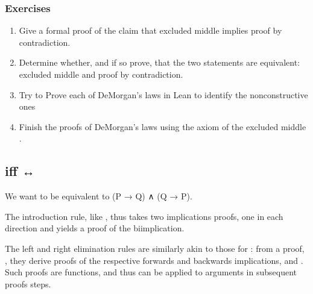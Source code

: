 \documentclass[letterpaper,10pt,english]{sphinxmanual}
\begin{document}
\subsubsection{Exercises}
\label{\detokenize{A_02_Constructive_Logic:exercises}}\begin{enumerate}
%
\item {} 
\sphinxAtStartPar
Give a formal proof of the claim that excluded middle implies proof by contradiction.

\item {} 
\sphinxAtStartPar
Determine whether, and if so prove, that the two statements are equivalent: excluded middle and proof by contradiction.

\item {} 
\sphinxAtStartPar
Try to Prove each of DeMorgan’s laws in Lean to identify the non\sphinxhyphen{}constructive ones

\item {} 
\sphinxAtStartPar
Finish the proofs of DeMorgan’s laws using the axiom of the excluded middle .

\end{enumerate}


\subsection{iff ↔}
\label{\detokenize{A_02_Constructive_Logic:iff}}
\begin{sphinxVerbatim}[commandchars=\\\{\}]
\end{sphinxVerbatim}

\sphinxAtStartPar
We want  to be equivalent to (P → Q) ∧ (Q → P).

\sphinxAtStartPar
The
introduction rule,  like , thus
takes two implications proofs, one in each direction and
yields a proof of the biimplication.

\sphinxAtStartPar
The  left and right elimination rules are similarly akin
to those for : from a proof, , they derive
proofs of the respective forwards and backwards implications,
 and . Such proofs are functions, and thus can
be applied to arguments in subsequent proofs steps.
\end{document}
